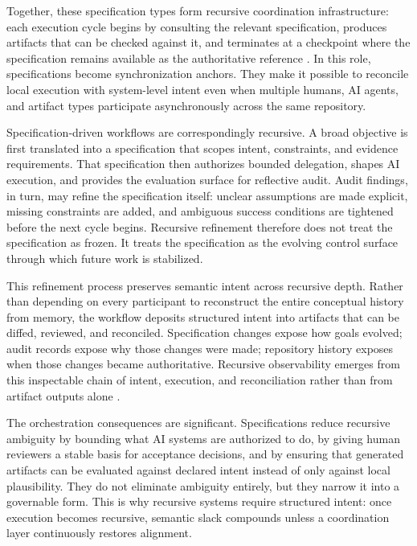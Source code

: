 Together, these specification types form recursive coordination infrastructure: each execution cycle begins by consulting the relevant specification, produces artifacts that can be checked against it, and terminates at a checkpoint where the specification remains available as the authoritative reference \cite{Beer1972BrainFirm}. In this role, specifications become synchronization anchors. They make it possible to reconcile local execution with system-level intent even when multiple humans, AI agents, and artifact types participate asynchronously across the same repository.

Specification-driven workflows are correspondingly recursive. A broad objective is first translated into a specification that scopes intent, constraints, and evidence requirements. That specification then authorizes bounded delegation, shapes AI execution, and provides the evaluation surface for reflective audit. Audit findings, in turn, may refine the specification itself: unclear assumptions are made explicit, missing constraints are added, and ambiguous success conditions are tightened before the next cycle begins. Recursive refinement therefore does not treat the specification as frozen. It treats the specification as the evolving control surface through which future work is stabilized.

This refinement process preserves semantic intent across recursive depth. Rather than depending on every participant to reconstruct the entire conceptual history from memory, the workflow deposits structured intent into artifacts that can be diffed, reviewed, and reconciled. Specification changes expose how goals evolved; audit records expose why those changes were made; repository history exposes when those changes became authoritative. Recursive observability emerges from this inspectable chain of intent, execution, and reconciliation rather than from artifact outputs alone \cite{Chandy1985DistributedSnapshots}.

The orchestration consequences are significant. Specifications reduce recursive ambiguity by bounding what AI systems are authorized to do, by giving human reviewers a stable basis for acceptance decisions, and by ensuring that generated artifacts can be evaluated against declared intent instead of only against local plausibility. They do not eliminate ambiguity entirely, but they narrow it into a governable form. This is why recursive systems require structured intent: once execution becomes recursive, semantic slack compounds unless a coordination layer continuously restores alignment.

